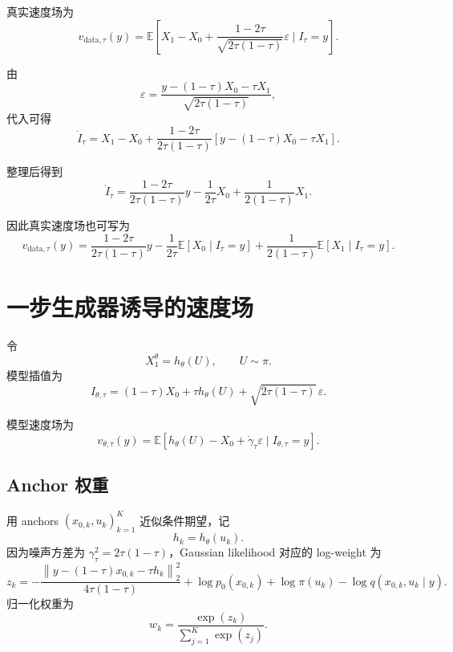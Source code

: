 \documentclass[UTF8,11pt]{ctexart}
\newcommand{\E}{\mathbb{E}}
\begin{document}
真实速度场为
\begin{equation}
v_{\mathrm{data},\tau}(y)
=
\E
\left[
X_1-X_0
+
\frac{1-2\tau}
{\sqrt{2\tau(1-\tau)}}\varepsilon
\mid
I_\tau=y
\right].
\end{equation}

由
\begin{equation}
\varepsilon
=
\frac{
y-(1-\tau)X_0-\tau X_1
}{
\sqrt{2\tau(1-\tau)}
},
\end{equation}
代入可得
\begin{equation}
\dot I_\tau
=
X_1-X_0
+
\frac{1-2\tau}
{2\tau(1-\tau)}
\left[
y-(1-\tau)X_0-\tau X_1
\right].
\end{equation}

整理后得到
\begin{equation}
\dot I_\tau
=
\frac{1-2\tau}
{2\tau(1-\tau)}y
-
\frac{1}{2\tau}X_0
+
\frac{1}{2(1-\tau)}X_1.
\end{equation}

因此真实速度场也可写为
\begin{equation}
v_{\mathrm{data},\tau}(y)
=
\frac{1-2\tau}
{2\tau(1-\tau)}y
-
\frac{1}{2\tau}
\E[X_0\mid I_\tau=y]
+
\frac{1}{2(1-\tau)}
\E[X_1\mid I_\tau=y].
\end{equation}

\section{一步生成器诱导的速度场}

令
\begin{equation}
X_1^\theta=h_\theta(U),
\qquad
U\sim \pi.
\end{equation}
模型插值为
\begin{equation}
I_{\theta,\tau}
=
(1-\tau)X_0
+
\tau h_\theta(U)
+
\sqrt{2\tau(1-\tau)}\,\varepsilon.
\end{equation}

模型速度场为
\begin{equation}
v_{\theta,\tau}(y)
=
\E
\left[
h_\theta(U)-X_0
+
\dot\gamma_\tau\varepsilon
\mid
I_{\theta,\tau}=y
\right].
\end{equation}

\subsection{Anchor 权重}

用 anchors \((x_{0,k},u_k)_{k=1}^K\) 近似条件期望，记
\begin{equation}
h_k=h_\theta(u_k).
\end{equation}
因为噪声方差为 \(\gamma_\tau^2=2\tau(1-\tau)\)，Gaussian likelihood 对应的 log-weight 为
\begin{equation}
z_k
=
-
\frac{
\left\|
y-(1-\tau)x_{0,k}-\tau h_k
\right\|_2^2
}{
4\tau(1-\tau)
}
+
\log p_0(x_{0,k})
+
\log \pi(u_k)
-
\log q(x_{0,k},u_k\mid y).
\end{equation}
归一化权重为
\begin{equation}
w_k
=
\frac{\exp(z_k)}
{\sum_{j=1}^{K}\exp(z_j)}.
\end{equation}
\end{document}
